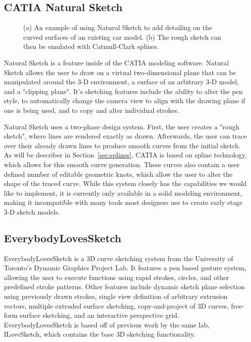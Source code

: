 \subsection{CATIA Natural Sketch}

\begin{figure}
\centering     %
{}
\caption[Using Natural Sketch to Add Detailing to a Car.] {(a) An example of using Natural Sketch to add detailing on the curved surfaces of an existing car model. (b) The rough sketch can then be emulated with Catmull-Clark splines. \autocite{catiareel}}
\end{figure}

Natural Sketch is a feature inside of the CATIA modeling software\autocite{catia}. 
Natural Sketch allows the user to draw on a virtual two-dimensional plane that can be manipulated around the 3-D environment, a surface of an arbitrary 3-D model, and a "clipping plane". 
It's sketching features include the ability to alter the pen style, to automatically change the camera view to align with the drawing plane if one is being used, and to  copy and alter individual strokes.

Natural Sketch uses a two-phase design system. 
First, the user creates a "rough sketch", where lines are rendered exactly as drawn. 
Afterwards, the user can trace over their already drawn lines to produce smooth curves from the initial sketch.
As will be describer in Section~\ref{sec:splines}, CATIA is based on spline technology, which allows for this smooth curve generation.
These curves also contain a user defined number of editable geometric knots, which allow the user to alter the shape of the traced curve.
While this system closely has the capabilities we would like to implement, it is currently only available in a solid modeling environment, making it incompatible with many tools most designers use to create early stage 3-D sketch models.



\subsection{EverybodyLovesSketch}

EverybodyLovesSketch \autocite{lovesketch} is a 3D curve sketching system from the University of Toronto's Dynamic Graphics Project Lab. 
It features a pen based gesture system, allowing the user to execute functions using rapid strokes, circles, and other predefined stroke patterns.
Other features include dynamic sketch plane selection using previously drawn strokes, single view definition of arbitrary extrusion vectors, multiple extruded surface sketching, copy-and-project of 3D curves, free-form surface sketching, and an interactive perspective grid. 
EverybodyLovesSketch is based off of previous work by the same lab, ILoveSketch, which contains the base 3D sketching functionality.

